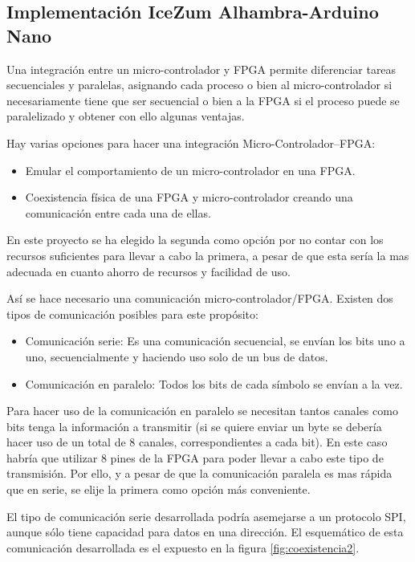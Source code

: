 \subsection{Implementación IceZum Alhambra-Arduino Nano}\label{sec:Integracion}
Una integración entre un micro-controlador y FPGA permite diferenciar tareas secuenciales y paralelas, asignando cada proceso o bien al micro-controlador si necesariamente tiene que ser secuencial o bien a la FPGA si el proceso puede se paralelizado y obtener con ello algunas ventajas. \newline

Hay varias opciones para hacer una integración Micro-Controlador--FPGA:

\begin{itemize}
	\item Emular el comportamiento de un micro-controlador en una FPGA.
	\item Coexistencia física de una FPGA y micro-controlador creando una comunicación entre cada una de ellas.
\end{itemize}
En este proyecto se ha elegido la segunda como opción por no contar con los recursos suficientes para llevar a cabo la primera, a pesar de que esta sería la mas adecuada en cuanto ahorro de recursos y facilidad de uso. \newline

Así se hace necesario una comunicación micro-controlador/FPGA. Existen dos tipos de comunicación posibles para este propósito: 
\begin{itemize}
	\item Comunicación serie: Es una comunicación secuencial, se envían los bits uno a uno, secuencialmente y haciendo uso solo de un bus de datos.
	\item Comunicación en paralelo: Todos los bits de cada símbolo se envían a la vez.
\end{itemize} 

Para hacer uso de la comunicación en paralelo se necesitan tantos canales como bits tenga la información a transmitir (si se quiere enviar un byte se debería hacer uso de un total de 8 canales, correspondientes a cada bit). En este caso habría que utilizar 8 pines de la FPGA para poder llevar a cabo este tipo de transmisión. Por ello, y a pesar de que la comunicación paralela es mas rápida que en serie, se elije la primera como opción más conveniente. \newline

El tipo de comunicación serie desarrollada podría asemejarse a un protocolo SPI, aunque sólo tiene capacidad para datos en una dirección. El esquemático de esta comunicación desarrollada es el expuesto en la figura \ref{fig:coexistencia2}.

